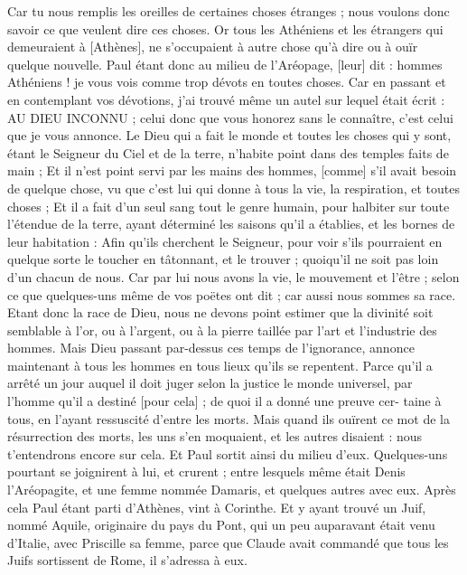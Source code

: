 \begin{multicols}{2}
Car tu nous remplis les oreilles de certaines choses étranges ; nous voulons donc savoir ce que veulent dire ces choses.
Or tous les Athéniens et les étrangers qui demeuraient à [Athènes], ne s'occupaient à autre chose qu'à dire ou à ouïr quelque nouvelle.
Paul étant donc au milieu de l'Aréopage, [leur] dit : hommes Athéniens ! je vous vois comme trop dévots en toutes choses.
Car en passant et en contemplant vos dévotions, j'ai trouvé même un autel sur lequel était écrit : AU DIEU INCONNU ; celui donc que vous honorez sans le connaître, c'est celui que je vous annonce.
Le Dieu qui a fait le monde et toutes les choses qui y sont, étant le Seigneur du Ciel et de la terre, n'habite point dans des temples faits de main ;
Et il n'est point servi par les mains des hommes, [comme] s'il avait besoin de quelque chose, vu que c'est lui qui donne à tous la vie, la respiration, et toutes choses ;
Et il a fait d'un seul sang tout le genre humain, pour halbiter sur toute l'étendue de la terre, ayant déterminé les saisons qu'il a établies, et les bornes de leur habitation :
Afin qu'ils cherchent le Seigneur, pour voir s'ils pourraient en quelque sorte le toucher en tâtonnant, et le trouver ; quoiqu'il ne soit pas loin d'un chacun de nous.
Car par lui nous avons la vie, le mouvement et l'être ; selon ce que quelques-uns même de vos poëtes ont dit ; car aussi nous sommes sa race.
Etant donc la race de Dieu, nous ne devons point estimer que la divinité soit semblable à l'or, ou à l'argent, ou à la pierre taillée par l'art et l'industrie des hommes.
Mais Dieu passant par-dessus ces temps de l'ignorance, annonce maintenant à tous les hommes en tous lieux qu'ils se repentent.
Parce qu'il a arrêté un jour auquel il doit juger selon la justice le monde universel, par l'homme qu'il a destiné [pour cela] ; de quoi il a donné une preuve cer- taine à tous, en l'ayant ressuscité d'entre les morts.
Mais quand ils ouïrent ce mot de la résurrection des morts, les uns s'en moquaient, et les autres disaient : nous t'entendrons encore sur cela.
Et Paul sortit ainsi du milieu d'eux.
Quelques-uns pourtant se joignirent à lui, et crurent ; entre lesquels même était Denis l'Aréopagite, et une femme nommée Damaris, et quelques autres avec eux.
\VerseOne{}Après cela Paul étant parti d'Athènes, vint à Corinthe.
Et y ayant trouvé un Juif, nommé Aquile, originaire du pays du Pont, qui un peu auparavant était venu d'Italie, avec Priscille sa femme, parce que Claude avait commandé que tous les Juifs sortissent de Rome, il s'adressa à eux.

\end{multicols}
